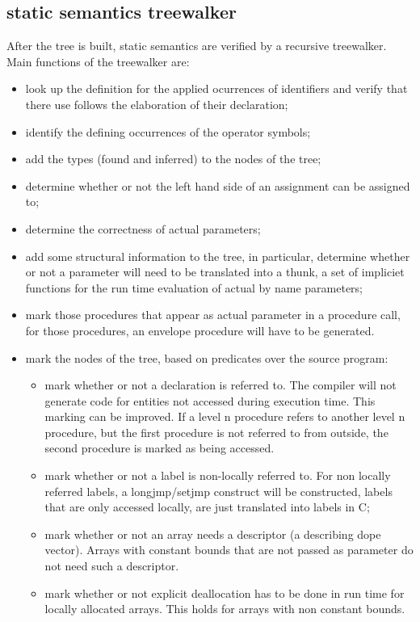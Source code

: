 \documentclass[11pt]{article}
\begin{document}
\subsection{static semantics treewalker}
After the tree is built, static semantics are verified by a recursive treewalker.
Main functions of the treewalker are:
\begin{itemize}
\item look up the definition for the applied ocurrences of identifiers and
verify that there use follows the elaboration of
their declaration;
\item identify the defining occurrences of the operator symbols;
\item add the types (found and inferred) to the nodes of the tree;
\item determine whether or not the left hand side of an assignment
can be assigned to;
\item determine the correctness of actual parameters;
\item add some structural information to the tree, in particular,
determine whether or not a parameter will need to be translated into
a thunk, a set of impliciet functions for the run time evaluation of actual
by name parameters;
\item mark those procedures that appear as actual parameter in a
procedure call, for those procedures, an envelope procedure will
have to be generated.
\item mark the nodes of the tree, based on predicates over the source program:
\begin{itemize}
\item mark whether or not a declaration is referred to. 
The compiler will not generate code for entities not accessed during execution
time. This marking can be improved. If a level n procedure refers to another
level n procedure, but the first procedure is not referred to from
outside, the second procedure is marked as being accessed.
\item mark whether or not a label is non-locally referred to.
For non locally referred labels, a longjmp/setjmp construct will be
constructed, labels that are
only accessed locally, are just translated into labels in C;
\item mark whether or not an array needs a descriptor
(a describing dope vector).
Arrays with constant bounds that are not passed as parameter do not need
such a descriptor.
\item mark whether or not explicit deallocation has to be done in run time
for locally allocated arrays. This holds for arrays with non constant bounds.

\end{itemize}
\end{itemize}
\end{document}
